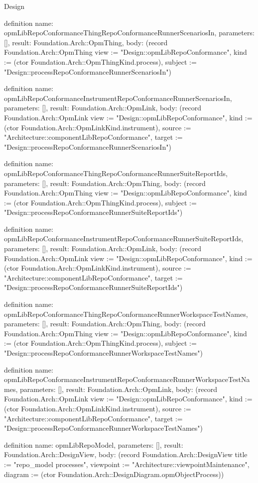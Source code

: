 \begin{lexlean}{Design}
\begin{semanticmodule}
definition{
  name: opmLibRepoConformanceThingRepoConformanceRunnerScenariosIn,
  parameters: [],
  result: Foundation.Arch::OpmThing,
  body: (record Foundation.Arch::OpmThing {view := "Design::opmLibRepoConformance", kind := (ctor Foundation.Arch::OpmThingKind.process), subject := "Design::processRepoConformanceRunnerScenariosIn"})
}

definition{
  name: opmLibRepoConformanceInstrumentRepoConformanceRunnerScenariosIn,
  parameters: [],
  result: Foundation.Arch::OpmLink,
  body: (record Foundation.Arch::OpmLink {view := "Design::opmLibRepoConformance", kind := (ctor Foundation.Arch::OpmLinkKind.instrument), source := "Architecture::componentLibRepoConformance", target := "Design::processRepoConformanceRunnerScenariosIn"})
}

definition{
  name: opmLibRepoConformanceThingRepoConformanceRunnerSuiteReportIds,
  parameters: [],
  result: Foundation.Arch::OpmThing,
  body: (record Foundation.Arch::OpmThing {view := "Design::opmLibRepoConformance", kind := (ctor Foundation.Arch::OpmThingKind.process), subject := "Design::processRepoConformanceRunnerSuiteReportIds"})
}

definition{
  name: opmLibRepoConformanceInstrumentRepoConformanceRunnerSuiteReportIds,
  parameters: [],
  result: Foundation.Arch::OpmLink,
  body: (record Foundation.Arch::OpmLink {view := "Design::opmLibRepoConformance", kind := (ctor Foundation.Arch::OpmLinkKind.instrument), source := "Architecture::componentLibRepoConformance", target := "Design::processRepoConformanceRunnerSuiteReportIds"})
}

definition{
  name: opmLibRepoConformanceThingRepoConformanceRunnerWorkspaceTestNames,
  parameters: [],
  result: Foundation.Arch::OpmThing,
  body: (record Foundation.Arch::OpmThing {view := "Design::opmLibRepoConformance", kind := (ctor Foundation.Arch::OpmThingKind.process), subject := "Design::processRepoConformanceRunnerWorkspaceTestNames"})
}

definition{
  name: opmLibRepoConformanceInstrumentRepoConformanceRunnerWorkspaceTestNames,
  parameters: [],
  result: Foundation.Arch::OpmLink,
  body: (record Foundation.Arch::OpmLink {view := "Design::opmLibRepoConformance", kind := (ctor Foundation.Arch::OpmLinkKind.instrument), source := "Architecture::componentLibRepoConformance", target := "Design::processRepoConformanceRunnerWorkspaceTestNames"})
}

definition{
  name: opmLibRepoModel,
  parameters: [],
  result: Foundation.Arch::DesignView,
  body: (record Foundation.Arch::DesignView {title := "repo_model processes", viewpoint := "Architecture::viewpointMaintenance", diagram := (ctor Foundation.Arch::DesignDiagram.opmObjectProcess)})
}


\end{semanticmodule}
\end{lexlean}
